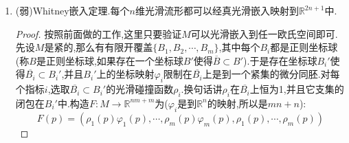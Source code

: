 \begin{enumerate}
\begin{proof}
    	\qquad
    	
    	构造$\psi:M\to\mathbb{R}^N\times\mathbb{R}$为$p\mapsto(G\circ F(p),f(p))$.按照$G\circ F$是光滑嵌入,导致$\psi$是一个单射,并且$\mathrm{d}\psi_p$是单射,于是$\psi$是一个单光滑浸入.$\psi$是一个真映射因为每个紧子集的原像都是某个$f^{-1}((-\infty,c])$的闭子集.我们解释过单光滑浸入如果是真映射那么它是光滑嵌入.于是$\psi$是光滑嵌入.按照我们的构造,$\psi$的像集落在$\mathbb{B}^N\times\mathbb{R}$中.于是我们证明了存在从$M$到$\mathbb{R}^{N+1}$的真光滑嵌入,使得它的像集落在某个管子$T_R(S)$中.换句话讲,$M$可视为某个$\mathbb{R}^{N+1}$的落在某个管子中的真正则子流形.
    	
    	\qquad
    	
    	如果$N+1>2n+1$,我们之前证明的结论说明存在向量$v\in\mathbb{R}^{N+1}-\mathbb{R}^N$使得$\pi_v\mid M$是从$M$到$\mathbb{R}^N$的单光滑浸入.另外我们可以选取$v$使得它不落在一维线性子空间$S$中.于是$\pi_v(S)$是$\mathbb{R}^N$的一维线性子空间,并且$\pi_v(M)$落在以一维线性子空间$\pi_v(S)$为中心的管子中($\pi_v$是有界线性映射).我们最后只要证明$\pi_v\mid M$是真映射,就导致$\pi_v(M)$是$\mathbb{R}^N$的真正则子流形.反复做这一段和上一段的事情,就把$M$经一个真光滑嵌入映射到$\mathbb{R}^{2n+1}$中.
    	
    	\qquad
    	
    	任取紧集$K\subset\mathbb{R}^N$,那么$K$落在某个以原点为圆心,半径$R_1$的开球中.对每个点$x\in\pi_v^{-1}(K)$,按照定义有$c\in\mathbb{R}$使得$\pi_v(x)=x-cv$.按照$|\pi_v(x)|<R_1$,这导致$x$落在以$\mathbb{R}v$为中心,半径为$R_1$的管子中.现在$M\cap\pi_v^{-1}(K)$就落在两个管子中,一个以$S$为中心,一个以$\mathbb{R}v$为中心.这两个一维线性子空间不是平行的,导致这两个管子的交是有界的.于是$M\cap\pi_v^{-1}(K)$是紧集,于是$\pi_v\mid M$是真映射.完成证明.
    \end{proof}
    \item (弱)Whitney嵌入定理.每个$n$维光滑流形都可以经真光滑嵌入映射到$\mathbb{R}^{2n+1}$中.
    \begin{proof}
    	
    	按照前面做的工作,这里只要验证$M$可以光滑嵌入到任一欧氏空间即可.先设$M$是紧的,那么有有限开覆盖$\{B_1,B_2,\cdots,B_m\}$,其中每个$B_i$都是正则坐标球(称$B$是正则坐标球,如果存在一个坐标球$B'$使得$\overline{B}\subset B'$).于是存在坐标球$B_i'$使得$\overline{B_i}\subset B_i'$,并且$B_i'$上的坐标映射$\varphi_i$限制在$\overline{B_i}$上是到一个紧集的微分同胚.对每个指标$i$,选取$\overline{B_i}\subset B_i'$的光滑碰撞函数$\rho_i$.换句话讲$\rho_i$在$\overline{B_i}$上恒为1,并且它支集的闭包在$B_i'$中.构造$F:M\to\mathbb{R}^{nm+m}$为($\varphi_i$是到$\mathbb{R}^n$的映射,所以是$mn+n$):
    	$$F(p)=\left(\rho_1(p)\varphi_1(p),\cdots,\rho_m(p)\varphi_m(p),\rho_1(p),\cdots,\rho_m(p)\right)$$
    	

\end{proof}
\end{enumerate}
